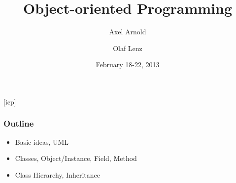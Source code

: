 \documentclass{slides}
\begin{document}
\graphicspath{{figures/}}

\title[Object-oriented Programming]{\Large Object-oriented Programming}

\author[A. Arnold and O. Lenz]{Axel Arnold \and Olaf Lenz} 
\date{February 18-22, 2013}

\begin{frame}
  \titlepage
\end {frame}
[icp]

\begin{frame}
  \frametitle{Outline}
  \begin{itemize}
  \item Basic ideas, UML
  \item Classes, Object/Instance, Field, Method
  \item Class Hierarchy, Inheritance
  \end{itemize}
\end{frame}
\end{document}

